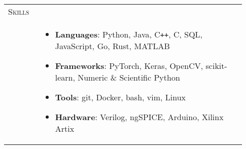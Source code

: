 \documentclass[letterpaper, 10pt, oneside]{article}
\newcommand{\stitle}[1]{\normalsize{\textsc{#1}}}
\newcommand{\bdit}[1]{{\textbf{#1}}}
\begin{document}
\begin{longtable}{@{} p{0.13\linewidth} p{0.8\linewidth}}
    \stitle{Skills}                                   &                                                                                                                                                                                                       \\[-2.34ex]
                                                      & \parbox{0.8\textwidth}{                                                                                                                                                                               %
        \begin{itemize}[leftmargin=0ex, itemsep=-0.4ex, topsep=-2ex, label={}]
            \item \bdit{Languages}: Python, Java, C\texttt{++}, C, SQL, JavaScript, Go, Rust, MATLAB
            \item \bdit{Frameworks}:  PyTorch, Keras, OpenCV, scikit-learn, Numeric \& Scientific Python
            \item \bdit{Tools}:     git, Docker, bash, vim, Linux
            \item \bdit{Hardware}:  Verilog, ngSPICE, Arduino, Xilinx Artix
        \end{itemize}
    }
    \\
    \\[1ex]


\end{longtable}
\end{document}
